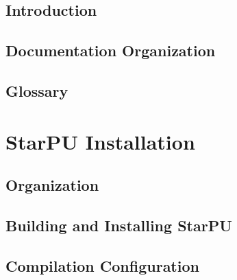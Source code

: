 %
%
%
%
%
\newcommand\starputitle{StarPU Handbook}
\setcounter{tocdepth}{1}


\chapter{Introduction}
\label{index}
\hypertarget{index}{}


\chapter{Documentation Organization}
\label{DocumentationOrganization}
\hypertarget{DocumentationOrganization}{}


\chapter{Glossary}
\label{Glossary}
\hypertarget{Glossary}{}


\part{StarPU Installation}

\chapter{Organization}
\label{IntroInstallation}
\hypertarget{IntroInstallation}{}


\chapter{Building and Installing StarPU}
\label{BuildingAndInstallingStarPU}
\hypertarget{BuildingAndInstallingStarPU}{}


\chapter{Compilation Configuration}
\label{CompilationConfiguration}
\hypertarget{CompilationConfiguration}{}


